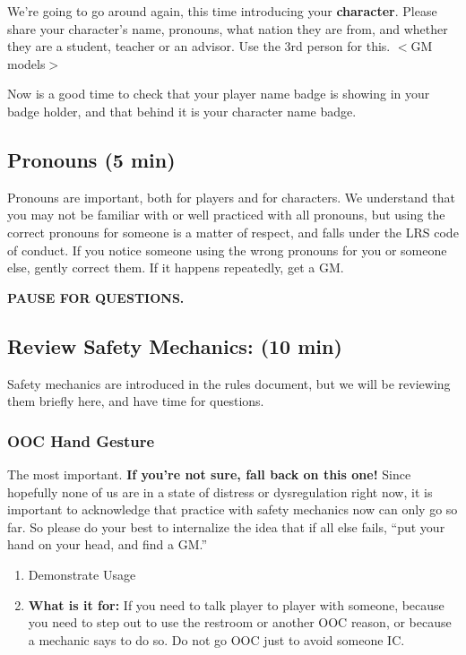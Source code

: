 \documentclass[green]{GL2020}
\begin{document}
We’re going to go around again, this time introducing your \textbf{character}. Please share your character’s name, pronouns, what nation they are from, and whether they are a student, teacher or an advisor. Use the 3rd person for this. $<$GM models$>$

Now is a good time to check that your player name badge is showing in your badge holder, and that behind it is your character name badge.


\subsection*{Pronouns (5 min)}
Pronouns are important, both for players and for characters. We understand that you may not be familiar with or well practiced with all pronouns, but using the correct pronouns for someone is a matter of respect, and falls under the LRS code of conduct. If you notice someone using the wrong pronouns for you or someone else, gently correct them. If it happens repeatedly, get a GM.

\textbf{PAUSE FOR QUESTIONS.}

\subsection*{Review Safety Mechanics: (10 min)}
Safety mechanics are introduced in the rules document, but we will be reviewing them briefly here, and have time for questions.

\subsubsection*{OOC Hand Gesture}
The most important. \textbf{If you’re not sure, fall back on this one!} Since hopefully none of us are in a state of distress or dysregulation right now, it is important to acknowledge that practice with safety mechanics now can only go so far. So please do your best to internalize the idea that if all else fails, ``put your hand on your head, and find a GM.''

\begin{enumerate}
	\item Demonstrate Usage
	\item \textbf{What is it for:} If you need to talk player to player with someone, because you need to step out to use the restroom or another OOC reason, or because a mechanic says to do so. Do not go OOC just to avoid someone IC.
\end{enumerate}	
	
\end{document}
